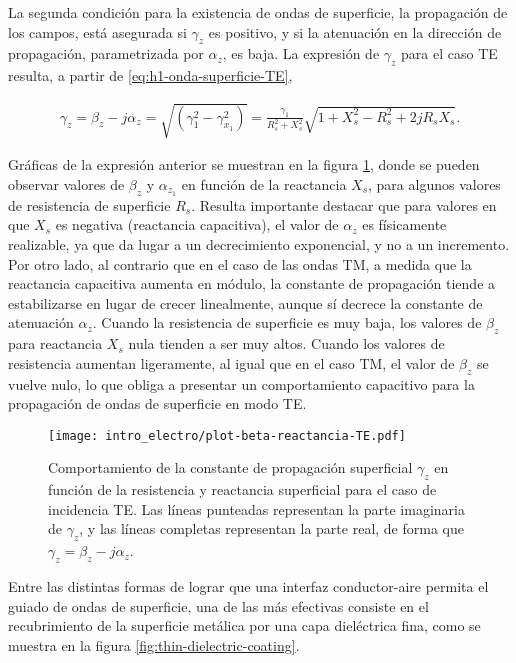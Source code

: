 La segunda condición para la existencia de ondas de superficie, la propagación de los campos, está asegurada si $\gamma_z$ es positivo, y si la atenuación en la dirección de propagación, parametrizada por $\alpha_z$, es baja. La expresión de $\gamma_z$ para el caso TE resulta, a partir de \ref{eq:h1-onda-superficie-TE},

\begin{align}
	\gamma_z = \beta_z-j\alpha_z= \sqrt{(\gamma_1^2 - \gamma_{x_1}^2)} = \frac{\gamma_1}{R_s^2+X_s^2} \sqrt{1+X_s^2 - R_s^2 + 2jR_s X_s}. \label{eq:beta-onda-superficie-TE}
\end{align}

Gráficas de la expresión anterior se muestran en la figura \ref{fig:beta-reactancia-TE}, donde se pueden observar valores de $\beta_z$ y $\alpha_{z_1}$ en función de la reactancia $X_s$, para algunos valores de resistencia de superficie $R_s$. Resulta importante destacar que para valores en que $X_s$ es negativa (reactancia capacitiva), el valor de $\alpha_z$ es físicamente realizable, ya que da lugar a un decrecimiento exponencial, y no a un incremento. Por otro lado, al contrario que en el caso de las ondas TM, a medida que la reactancia capacitiva aumenta en módulo, la constante de propagación tiende a estabilizarse en lugar de crecer linealmente, aunque sí decrece la constante de atenuación $\alpha_z$. Cuando la resistencia de superficie es muy baja, los valores de $\beta_z$ para reactancia $X_s$ nula tienden a ser muy altos. Cuando los valores de resistencia aumentan ligeramente, al igual que en el caso TM, el valor de $\beta_z$ se vuelve nulo, lo que obliga a presentar un comportamiento capacitivo para la propagación de ondas de superficie en modo TE.


\begin{figure}[htp]
	\centering
	\texttt{[image: intro\_electro/plot-beta-reactancia-TE.pdf]}
	\caption{Comportamiento de la constante de propagación superficial $\gamma_z$ en función de la resistencia y reactancia superficial para el caso de incidencia TE. Las líneas punteadas representan la parte imaginaria de $\gamma_z$, y las líneas completas representan la parte real, de forma que $\gamma_z = \beta_z - j\alpha_z$.}
	\label{fig:beta-reactancia-TE}
\end{figure}

Entre las distintas formas de lograr que una interfaz conductor-aire permita el guiado de ondas de superficie, una de las más efectivas consiste en el recubrimiento de la superficie metálica por una capa dieléctrica fina, como se muestra en la figura \ref{fig:thin-dielectric-coating}.

